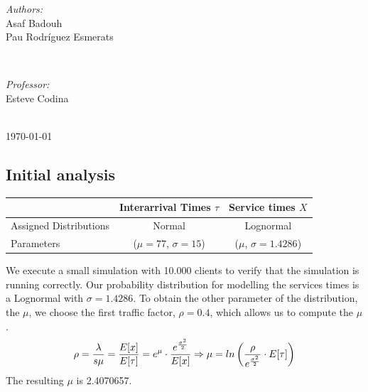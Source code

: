 \documentclass[]{article}
\begin{document}
\begin{titlepage}
\begin{center}
\begin{bottompar}
\begin{minipage}{0.5\textwidth}
\begin{flushleft} \large
\emph{Authors:}\\
Asaf Badouh \\ Pau Rodríguez Esmerats %
\end{flushleft}
\end{minipage}
~
\begin{minipage}{0.4\textwidth}
\begin{flushright} \large
\emph{Professor:} \\
Esteve Codina
\end{flushright}
\end{minipage}\\[2cm]


{\large \today}\\[2cm] %
\end{bottompar}
\end{center}
\end{titlepage}

\tableofcontents
\pagebreak


\subsection{Initial analysis}\label{initial-analysis}

\begin{longtable}[]{@{}lcc@{}}
\toprule
& Interarrival Times \(\tau\) & Service times \(X\)\tabularnewline
\midrule
\endhead
Assigned Distributions & Normal & Lognormal\tabularnewline
Parameters & (\(\mu=77\), \(\sigma=15\)) & (\(\mu\),
\(\sigma=1.4286\))\tabularnewline
\bottomrule
\end{longtable}

We execute a small simulation with 10.000 clients to verify that the
simulation is running correctly. Our probability distribution for
modelling the services times is a Lognormal with \(\sigma=1.4286\). To
obtain the other parameter of the distribution, the \(\mu\), we choose
the first traffic factor, \(\rho=0.4\), which allows us to compute the
\(\mu\).\\
\[  \rho = { \lambda \over {s\mu}} = { E[x] \over E[\tau] } = e^{\mu} \cdot { e^{\sigma^{2} \over 2} \over E[x] } \Rightarrow \mu = ln \left( { \rho \over e^{ \sigma^{2} \over 2 } } \cdot E[\tau]  \right) \]
The resulting \(\mu\) is 2.4070657.
\end{document}

